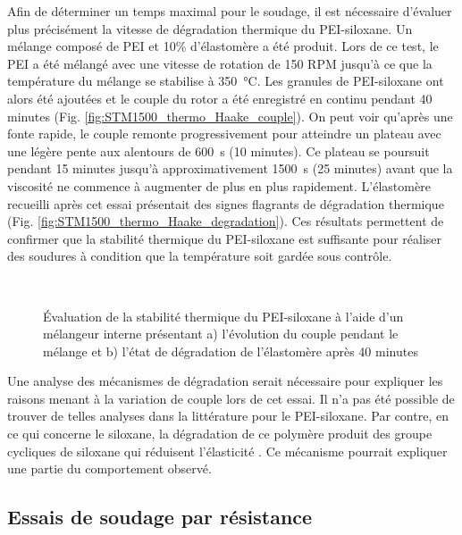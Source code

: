 Afin de déterminer un temps maximal pour le soudage, il est nécessaire d'évaluer plus précisément la vitesse de dégradation thermique du PEI-siloxane. 
Un mélange composé de PEI et 10\% d'élastomère a été produit. 
Lors de ce test, le PEI a été mélangé avec une vitesse de rotation de 150 RPM jusqu'à ce que la température du mélange se stabilise à \SI[locale=FR]{350}{\celsius}. 
Les granules de PEI-siloxane ont alors été ajoutées et le couple du rotor a été enregistré en continu pendant 40 minutes (Fig. \ref{fig:STM1500_thermo_Haake_couple}). 
On peut voir qu'après une fonte rapide, le couple remonte progressivement pour atteindre un plateau avec une légère pente aux alentours de \SI[locale=FR]{600}{\second} (10 minutes). 
Ce plateau se poursuit pendant 15 minutes jusqu'à approximativement \SI[locale=FR]{1500}{\second} (25 minutes) avant que la viscosité ne commence à augmenter de plus en plus rapidement. 
L'élastomère recueilli après cet essai présentait des signes flagrants de dégradation thermique (Fig. \ref{fig:STM1500_thermo_Haake_degradation}). 
Ces résultats permettent de confirmer que la stabilité thermique du PEI-siloxane est suffisante pour réaliser des soudures à condition que la température soit gardée sous contrôle. 

\begin{figure}[h]	
	\centering
	 \qquad
	 \\
	\caption{Évaluation de la stabilité thermique du PEI-siloxane à l'aide d'un mélangeur interne présentant a) l'évolution du couple pendant le mélange et b) l'état de dégradation de l'élastomère après 40 minutes}
	\label{fig:STM1500_thermo_Haake}
\end{figure}

Une analyse des mécanismes de dégradation serait nécessaire pour expliquer les raisons menant à la variation de couple lors de cet essai. 
Il n'a pas été possible de trouver de telles analyses dans la littérature pour le PEI-siloxane. 
Par contre, en ce qui concerne le siloxane, la dégradation de ce polymère produit des groupe cycliques de siloxane qui réduisent l'élasticité \cite{Heinemann2004}. 
Ce mécanisme pourrait expliquer une partie du comportement observé.  

\FloatBarrier

\subsection{Essais de soudage par résistance}

